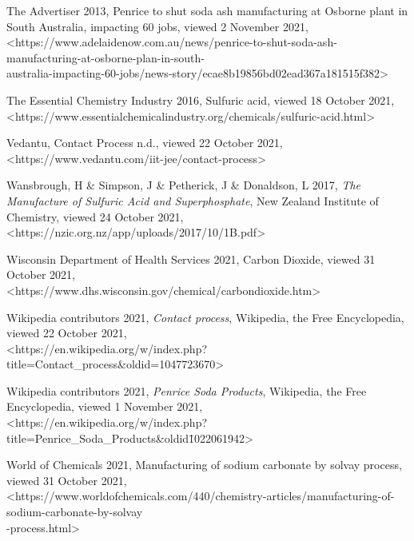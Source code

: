 \documentclass[12pt, a4paper]{article}
\begin{document}
The Advertiser 2013, Penrice to shut soda ash manufacturing at Osborne plant in South Australia, impacting 60 jobs, viewed 2 November 2021, \\ \textless{https://www.adelaidenow.com.au/news/penrice-to-shut-soda-ash-manufacturing-at-osborne-plan-in-south- \\ australia-impacting-60-jobs/news-story/ecae8b19856bd02ead367a181515f382}\textgreater

The Essential Chemistry Industry 2016, Sulfuric acid, viewed 18 October 2021, \\ \textless{https://www.essentialchemicalindustry.org/chemicals/sulfuric-acid.html}\textgreater

Vedantu, Contact Process n.d., viewed 22 October 2021, \\ \textless{https://www.vedantu.com/iit-jee/contact-process}\textgreater

Wansbrough, H \& Simpson, J \& Petherick, J \& Donaldson, L 2017, \emph{The Manufacture of Sulfuric Acid and Superphosphate}, New Zealand Institute of Chemistry, viewed 24 October 2021, \\ \textless{https://nzic.org.nz/app/uploads/2017/10/1B.pdf}\textgreater

Wisconsin Department of Health Services 2021, Carbon Dioxide, viewed 31 October 2021, \\ \textless{https://www.dhs.wisconsin.gov/chemical/carbondioxide.htm}\textgreater

Wikipedia contributors 2021, \emph{Contact process}, Wikipedia, the Free Encyclopedia, viewed 22 October 2021, \\ \textless{https://en.wikipedia.org/w/index.php?title=Contact\_process\&oldid=1047723670}\textgreater

Wikipedia contributors 2021, \emph{Penrice Soda Products}, Wikipedia, the Free Encyclopedia, viewed 1 November 2021, \\ \textless{https://en.wikipedia.org/w/index.php?title=Penrice\_Soda\_Products\&oldid\=1022061942}\textgreater

World of Chemicals 2021, Manufacturing of sodium carbonate by solvay process, viewed 31 October 2021, \\ \textless{https://www.worldofchemicals.com/440/chemistry-articles/manufacturing-of-sodium-carbonate-by-solvay \\ -process.html}\textgreater
\end{document}

